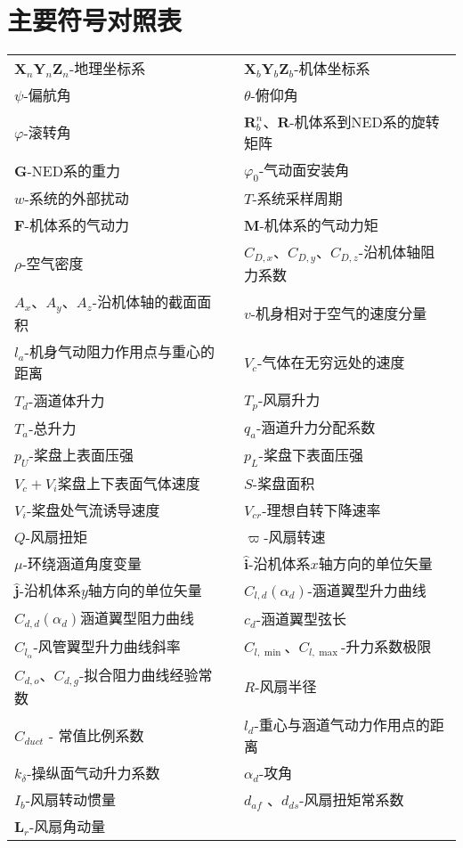 \chapter*{主要符号对照表}
\begin{table}
	\centering{}%
	\begin{tabular}{l>{\centering}p{0.5cm}l}
	 ${\bm{X}_n}{\bm{Y}_n}{\bm{Z}_n}$-地理坐标系	&  &  ${\bm{X}_b}{\bm{Y}_b}{\bm{Z}_b}$-机体坐标系\tabularnewline
	 $\psi$-偏航角	&  & $\theta$-俯仰角\tabularnewline
	 $\varphi$-滚转角  &  & $\bm{R}^n_b$、$\bm{R}$-机体系到NED系的旋转矩阵\tabularnewline
	 $\bm{G}$-NED系的重力  &  &   $\varphi_0 $-气动面安装角\tabularnewline
	  $ w $-系统的外部扰动&  &  $T$-系统采样周期\tabularnewline
	 $\bm{F}$-机体系的气动力  &  &   $\bm{M}$-机体系的气动力矩\tabularnewline
	 $\rho$-空气密度  &  &  $C_{D,x} $、$ C_{D,y} $、$ C_{D,z} $-沿机体轴阻力系数\tabularnewline
	 $A_x $、$ A_y $、$ A_z $-沿机体轴的截面面积  &  &  $v$-机身相对于空气的速度分量\tabularnewline 
	 $l_{a}$-机身气动阻力作用点与重心的距离   &  &  $V_c$-气体在无穷远处的速度\tabularnewline
	 $T_d$-涵道体升力  &  &  $T_p$-风扇升力\tabularnewline
	 $T_a$-总升力  &  &  $q_a$-涵道升力分配系数\tabularnewline
	 $ p_U $-桨盘上表面压强  &  &  $p_L$-桨盘下表面压强\tabularnewline
	 $V_c+V_i$桨盘上下表面气体速度  &  &  $S$-桨盘面积\tabularnewline
	 $ V_i $-桨盘处气流诱导速度  &  &  $ V_{cr} $-理想自转下降速率\tabularnewline
	 $ Q $-风扇扭矩  &  &  $ \varpi $-风扇转速\tabularnewline
	 $\mu$-环绕涵道角度变量  &  &  $\hat{\bm{i}}$-沿机体系$x$轴方向的单位矢量\tabularnewline 
	 $\hat{\bm{j}}$-沿机体系$y$轴方向的单位矢量  &  &  $C_{l, d}(\alpha_d)$-涵道翼型升力曲线\tabularnewline 
	 $C_{d, d}(\alpha_d)$涵道翼型阻力曲线  &  &  $c_d$-涵道翼型弦长\tabularnewline 
	 $C_{l_{\alpha}}$-风管翼型升力曲线斜率  &  &  $C_{l, \min }$、$ C_{l, \max } $-升力系数极限\tabularnewline 
	 $C_{d, o }$、$C_{d, g }$-拟合阻力曲线经验常数  &  &  $R$-风扇半径\tabularnewline 
	 $C_{d u c t}$ - 常值比例系数  &  &  $l_{d}$-重心与涵道气动力作用点的距离\tabularnewline
	 $k_{\delta}$-操纵面气动升力系数  &  &  $\alpha_d$-攻角\tabularnewline
	 $ I_{b}$-风扇转动惯量  &  &  $ d_{af} $ 、$ d_{ds} $-风扇扭矩常系数\tabularnewline
	  $\bm{L}_{{r}}$-风扇角动量  &  & \tabularnewline
	\end{tabular}
\end{table}